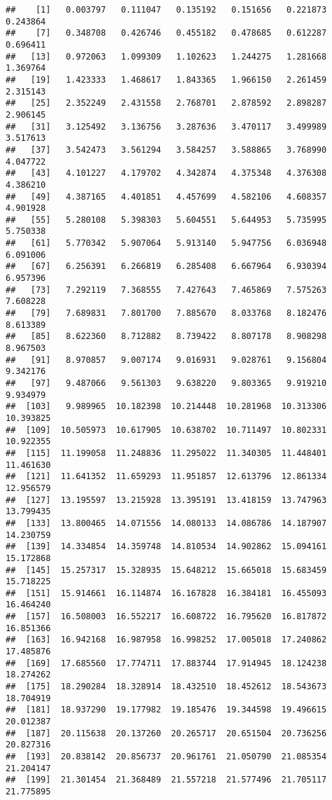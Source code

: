 \documentclass[]{article}
\begin{document}
\begin{verbatim}
##    [1]   0.003797   0.111047   0.135192   0.151656   0.221873   0.243864
##    [7]   0.348708   0.426746   0.455182   0.478685   0.612287   0.696411
##   [13]   0.972063   1.099309   1.102623   1.244275   1.281668   1.369764
##   [19]   1.423333   1.468617   1.843365   1.966150   2.261459   2.315143
##   [25]   2.352249   2.431558   2.768701   2.878592   2.898287   2.906145
##   [31]   3.125492   3.136756   3.287636   3.470117   3.499989   3.517613
##   [37]   3.542473   3.561294   3.584257   3.588865   3.768990   4.047722
##   [43]   4.101227   4.179702   4.342874   4.375348   4.376308   4.386210
##   [49]   4.387165   4.401851   4.457699   4.582106   4.608357   4.901928
##   [55]   5.280108   5.398303   5.604551   5.644953   5.735995   5.750338
##   [61]   5.770342   5.907064   5.913140   5.947756   6.036948   6.091006
##   [67]   6.256391   6.266819   6.285408   6.667964   6.930394   6.957396
##   [73]   7.292119   7.368555   7.427643   7.465869   7.575263   7.608228
##   [79]   7.689831   7.801700   7.885670   8.033768   8.182476   8.613389
##   [85]   8.622360   8.712882   8.739422   8.807178   8.908298   8.967503
##   [91]   8.970857   9.007174   9.016931   9.028761   9.156804   9.342176
##   [97]   9.487066   9.561303   9.638220   9.803365   9.919210   9.934979
##  [103]   9.989965  10.182398  10.214448  10.281968  10.313306  10.393825
##  [109]  10.505973  10.617905  10.638702  10.711497  10.802331  10.922355
##  [115]  11.199058  11.248836  11.295022  11.340305  11.448401  11.461630
##  [121]  11.641352  11.659293  11.951857  12.613796  12.861334  12.956579
##  [127]  13.195597  13.215928  13.395191  13.418159  13.747963  13.799435
##  [133]  13.800465  14.071556  14.080133  14.086786  14.187907  14.230759
##  [139]  14.334854  14.359748  14.810534  14.902862  15.094161  15.172868
##  [145]  15.257317  15.328935  15.648212  15.665018  15.683459  15.718225
##  [151]  15.914661  16.114874  16.167828  16.384181  16.455093  16.464240
##  [157]  16.508003  16.552217  16.608722  16.795620  16.817872  16.851366
##  [163]  16.942168  16.987958  16.998252  17.005018  17.240862  17.485876
##  [169]  17.685560  17.774711  17.883744  17.914945  18.124238  18.274262
##  [175]  18.290284  18.328914  18.432510  18.452612  18.543673  18.704919
##  [181]  18.937290  19.177982  19.185476  19.344598  19.496615  20.012387
##  [187]  20.115638  20.137260  20.265717  20.651504  20.736256  20.827316
##  [193]  20.838142  20.856737  20.961761  21.050790  21.085354  21.204147
##  [199]  21.301454  21.368489  21.557218  21.577496  21.705117  21.775895

\end{verbatim}
\end{document}
